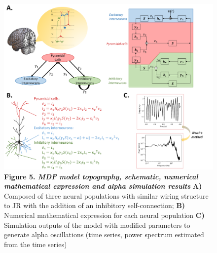 \documentclass[12pt,twoside]{article}
\begin{document}
\begin{figure}[H]
    \centering
    \includegraphics[scale=0.35]{Images/Moran_schematic_short.png}
    \caption*{\textbf{Figure 5.  \textit{MDF model topography, schematic, numerical mathematical expression and alpha simulation results}} \textbf{A)} Composed of three neural populations with similar wiring structure to JR with the addition of an inhibitory self-connection; \textbf{B)} Numerical mathematical expression for each neural population \textbf{C)} Simulation outputs of the model with modified parameters to generate alpha oscillations (time series, power spectrum estimated from the time series)}    
    \label{fig:Mor_topography}
\end{figure}
\end{document}
